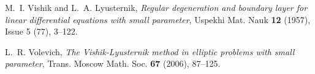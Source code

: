 \documentclass[10pt,a4paper]{article}
\begin{document}
\begin{thebibliography}{5}
%
%
%
%
%
%
%
%
%
M.~I. Vishik and L.~A. Lyusternik,
\emph{Regular degeneration and boundary layer for linear differential equations
with small parameter},
Uspekhi Mat. Nauk \textbf{12} (1957), Issue 5 (77), 3--122.

L.~R. Volevich,
\emph{The Vishik-Lyusternik method in elliptic problems with small parameter},
Trans. Moscow Math. Soc. \textbf{67} (2006), 87--125.
%
%
\end{thebibliography}
\end{document}
